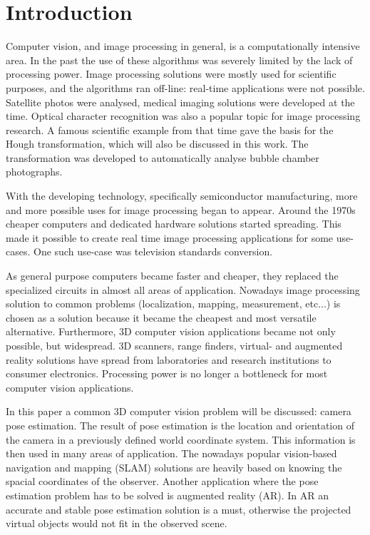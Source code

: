 \chapter*{Introduction}

Computer vision, and image processing in general, is a computationally intensive area.
In the past the use of these algorithms was severely limited by the lack of processing power.
Image processing solutions were mostly used for scientific purposes, and the algorithms ran off-line: real-time applications were not possible.
Satellite photos were analysed, medical imaging solutions were developed at the time.
Optical character recognition was also a popular topic for image processing research.
A famous scientific example from that time gave the basis for the Hough transformation, which will also be discussed in this work.
The transformation was developed to automatically analyse bubble chamber photographs.

With the developing technology, specifically semiconductor manufacturing, more and more possible uses for image processing began to appear.
Around the 1970s cheaper computers and dedicated hardware solutions started spreading.
This made it possible to create real time image processing applications for some use-cases.
One such use-case was television standards conversion.

As general purpose computers became faster and cheaper, they replaced the specialized circuits in almost all areas of application.
Nowadays image processing solution to common problems (localization, mapping, measurement, etc...) is chosen as a solution because it became the cheapest and most versatile alternative.
Furthermore, 3D computer vision applications became not only possible, but widespread.
3D scanners, range finders, virtual- and augmented reality solutions have spread from laboratories and research institutions to consumer electronics.
Processing power is no longer a bottleneck for most computer vision applications.

In this paper a common 3D computer vision problem will be discussed: camera pose estimation.
The result of pose estimation is the location and orientation of the camera in a previously defined world coordinate system.
This information is then used in many areas of application.
The nowadays popular vision-based navigation and mapping (SLAM) solutions are heavily based on knowing the spacial coordinates of the observer.
Another application where the pose estimation problem has to be solved is augmented reality (AR).
In AR an accurate and stable pose estimation solution is a must, otherwise the projected virtual objects would not fit in the observed scene.

